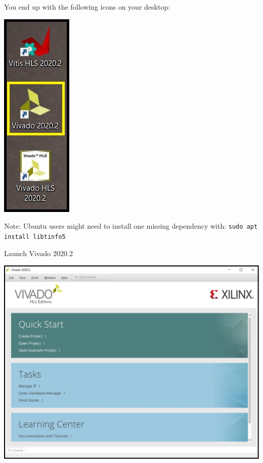 \begin{minipage}{\linewidth}
  You end up with the following icons on your desktop:
  \\
  \begin{center}
    \includegraphics[width=0.2\linewidth]{images/VivadoInstimg020.jpg}
  \end{center}
  Note: Ubuntu users might need to install one missing dependency with: {\tt sudo apt install libtinfo5}
\end{minipage}

\begin{minipage}{\linewidth}
  Launch Vivado 2020.2
  \\
  \begin{center}
    \includegraphics[width=0.7\linewidth]{images/VivadoInstimg021.jpg}
  \end{center}
\end{minipage}


